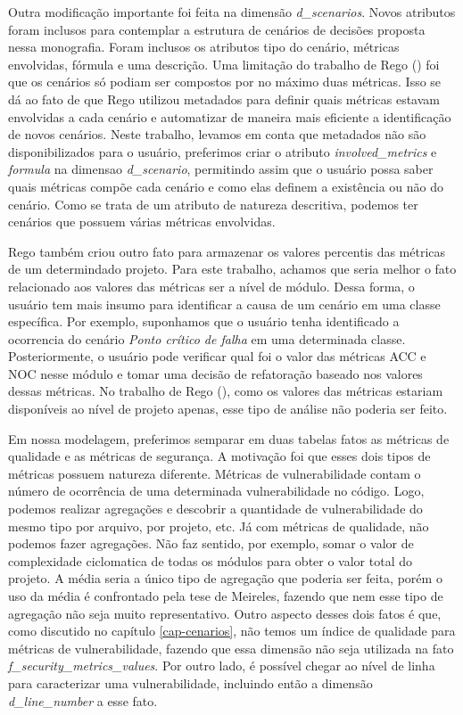 Outra modificação importante foi feita na dimensão \emph{d\_scenarios}. Novos atributos foram inclusos para contemplar a estrutura de cenários de decisões proposta nessa monografia. Foram inclusos os atributos tipo do cenário, métricas envolvidas, fórmula e uma descrição. Uma limitação do trabalho de Rego (\citeyear{rego2014}) foi que os cenários só podiam ser compostos por no máximo duas métricas. Isso se dá ao fato de que Rego utilizou  metadados para definir quais métricas estavam envolvidas a cada cenário e automatizar de maneira mais eficiente a identificação de novos cenários. Neste trabalho, levamos em conta que  metadados não são disponibilizados para o usuário, preferimos criar o atributo \emph{involved\_metrics} e \emph{formula} na dimensao \emph{d\_scenario}, permitindo assim que o usuário possa saber quais métricas compõe cada cenário e como elas definem a existência ou não do cenário. Como se trata de um atributo de natureza descritiva, podemos ter cenários que possuem várias métricas envolvidas.

Rego também criou outro fato para armazenar os valores percentis das métricas de um determindado projeto. Para este trabalho, achamos que seria melhor o fato relacionado aos valores das métricas ser a nível de módulo. Dessa forma, o usuário tem mais insumo para identificar a causa de um cenário em uma classe específica. Por exemplo, suponhamos que o usuário tenha identificado a ocorrencia do cenário \emph{Ponto crítico de falha} em uma determinada classe. Posteriormente, o usuário pode verificar qual foi o valor das métricas ACC e NOC nesse módulo e tomar uma decisão de refatoração baseado nos valores dessas métricas. No trabalho de Rego (\citeyear{rego2014}), como os valores das métricas estariam disponíveis ao nível de projeto apenas, esse tipo de análise não poderia ser feito.

Em nossa modelagem, preferimos semparar em duas tabelas fatos as métricas de qualidade e as métricas de segurança. A motivação foi que esses dois tipos de métricas possuem natureza diferente. Métricas de vulnerabilidade contam o número de ocorrência de uma determinada vulnerabilidade no código. Logo, podemos realizar agregações e descobrir a quantidade de vulnerabilidade do mesmo tipo por arquivo, por projeto, etc. Já com métricas de qualidade, não podemos fazer agregações. Não faz sentido, por exemplo, somar o valor de complexidade ciclomatica de todas os módulos para obter o valor total do projeto. A média seria a único tipo de agregação que poderia ser feita, porém o uso da média é confrontado pela tese de Meireles, fazendo que nem esse tipo de agregação não seja muito representativo. Outro aspecto desses dois fatos é que, como discutido no capítulo \ref{cap-cenarios}, não temos um índice de qualidade para métricas de vulnerabilidade, fazendo que essa dimensão não seja utilizada na fato \emph{f\_security\_metrics\_values}. Por outro lado, é possível chegar ao nível de linha para caracterizar uma vulnerabilidade, incluindo então a dimensão \emph{d\_line\_number} a esse fato.

